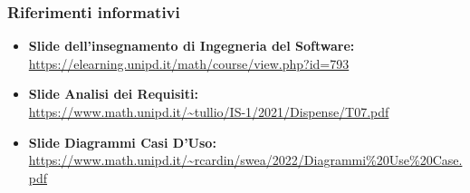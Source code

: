 \subsubsection{Riferimenti informativi}
\begin{itemize}
	\item 
    {\textbf{Slide dell'insegnamento di Ingegneria del Software:}}\\\url{https://elearning.unipd.it/math/course/view.php?id=793}
	\item
	{\textbf{Slide Analisi dei Requisiti:}}\\\url{https://www.math.unipd.it/~tullio/IS-1/2021/Dispense/T07.pdf}
	\item
	{\textbf{Slide Diagrammi Casi D'Uso:}}\\\url{https://www.math.unipd.it/~rcardin/swea/2022/Diagrammi%20Use%20Case.pdf}
\end{itemize}
